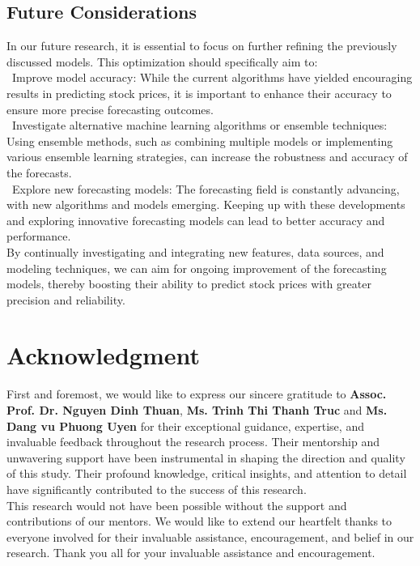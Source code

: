 \documentclass{ieeeojies}
\begin{document}
\subsection{Future Considerations}
In our future research, it is essential to focus on further refining the previously discussed models. This optimization should specifically aim to:\\
\indent\textbullet\ Improve model accuracy: While the current algorithms have yielded encouraging results in predicting stock prices, it is important to enhance their accuracy to ensure more precise forecasting outcomes.\\
\indent\textbullet\ Investigate alternative machine learning algorithms or ensemble techniques: Using ensemble methods, such as combining multiple models or implementing various ensemble learning strategies, can increase the robustness and accuracy of the forecasts.\\
\indent\textbullet\ Explore new forecasting models: The forecasting field is constantly advancing, with new algorithms and models emerging. Keeping up with these developments and exploring innovative forecasting models can lead to better accuracy and performance.\\
By continually investigating and integrating new features, data sources, and modeling techniques, we can aim for ongoing improvement of the forecasting models, thereby boosting their ability to predict stock prices with greater precision and reliability.

\section*{Acknowledgment}
First and foremost, we would like to express our sincere gratitude to \textbf{Assoc. Prof. Dr. Nguyen Dinh Thuan}, \textbf{Ms. Trinh Thi Thanh Truc} and \textbf{Ms. Dang vu Phuong Uyen} for their exceptional guidance, expertise, and invaluable feedback throughout the research process. Their mentorship and unwavering support have been instrumental in shaping the direction and quality of this study. Their profound knowledge, critical insights, and attention to detail have significantly contributed to the success of this research.
\\This research would not have been possible without the support and contributions of our mentors. We would like to extend our heartfelt thanks to everyone involved for their invaluable assistance, encouragement, and belief in our research. Thank you all for your invaluable assistance and encouragement.
\end{document}
